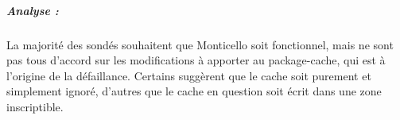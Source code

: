 \subparagraph{Analyse :}
La majorité des sondés souhaitent que Monticello soit fonctionnel, mais ne sont pas tous d'accord sur les modifications à apporter au package-cache, qui est à l'origine de la défaillance. Certains suggèrent que le cache soit purement et simplement ignoré, d'autres que le cache en question soit écrit dans une zone inscriptible.





